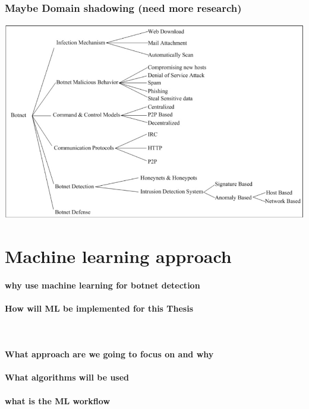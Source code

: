 \subsubsection{Maybe Domain shadowing (need more research)}
\includegraphics[scale=.8]{img/botnet_taxonomy.jpg}

\section{Machine learning approach}
\paragraph{why use machine learning for botnet detection}
\paragraph{How will ML be implemented for this Thesis}\\
\paragraph{What approach are we going to focus on and why}
\paragraph{What algorithms will be used }
\paragraph{what is the ML workflow}



